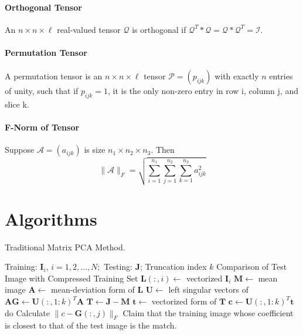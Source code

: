 \documentclass[english]{article}
\newcommand{\<}{\langle}
\renewcommand{\>}{\rangle}
\theoremstyle{definition}
\begin{document}
\paragraph{Orthogonal Tensor} An $ n \times n \times \ell $ real-valued tensor $ \mathcal{Q} $ is orthogonal if $ \mathcal{Q}^{T} * \mathcal{Q}= \mathcal{Q} * \mathcal{Q}^{T}=\mathcal{I}$.
\paragraph{Permutation Tensor} A permutation tensor is an $ n \times n \times \ell $ tensor  $\mathcal{P}=\left(p_{i j k}\right)$  with exactly $ n $ entries of unity, such that if  $p_{i j k}=1$,  it is the only non-zero entry in row i, column j, and slice k.
\paragraph{F-Norm of Tensor} Suppose $\mathcal{A}=\left(a_{i j k}\right)$ is size $ n_{1} \times n_{2} \times n_{3} $.  Then
$$ \|\mathcal{A}\|_{F}=\sqrt{\sum_{i=1}^{n_{1}} \sum_{j=1}^{n_{2}} \sum_{k=1}^{n_{3}} a_{i j k}^{2}} $$

\section{Algorithms}
\begin{algorithm}  
	\caption{Traditional Matrix PCA Method.}
	\begin{algorithmic} 
		\Require  
		Training:  $\mathbf{I}_{i}$, $i=1,2, \ldots, N; $ Testing: $ \mathbf{J}$;  Truncation index $ k $
		\Ensure  
		Comparison of Test Image with Compressed Training Set  
		\State $ \mathbf{L}(:, i) \leftarrow $ vectorized $ \mathbf{I}_{i} $
		\EndFor
		\State $ \mathbf{M} \leftarrow $ mean image
		\State $ \mathbf{A} \leftarrow $ mean-deviation form of $ \mathbf{L}  $
		\State $ \mathbf{U} \leftarrow $ left singular vectors of $ \mathbf{A}   \mathbf{G} \leftarrow \mathbf{U}(:, 1: k)^{T} \mathbf{A} $
		\State $ \mathbf{T} \leftarrow \mathbf{J}-\mathbf{M} $
		\State $ \mathbf{t} \leftarrow $ vectorized form of $ \mathbf{T} $  
		\State $ \mathbf{c} \leftarrow \mathbf{U}(:, 1: k)^{T} \mathbf{t}  $
		\State do Calculate $ \|c-\mathbf{G}(:, j)\|_{F}$
		\EndFor
		\State Claim that the training image whose coefficient is closest to that of the test image is the match. 
	\end{algorithmic}
\end{algorithm}  
\end{document}
